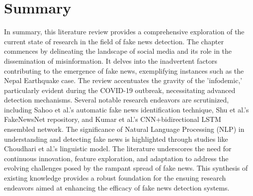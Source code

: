 \section{Summary} 
In summary, this literature review provides a comprehensive exploration of the current state of research in the field of fake news detection. The chapter commences by delineating the landscape of social media and its role in the dissemination of misinformation. It delves into the inadvertent factors contributing to the emergence of fake news, exemplifying instances such as the Nepal Earthquake case. The review accentuates the gravity of the 'infodemic,' particularly evident during the COVID-19 outbreak, necessitating advanced detection mechanisms. Several notable research endeavors are scrutinized, including Sahoo et al.'s automatic fake news identification technique, Shu et al.'s FakeNewsNet repository, and Kumar et al.'s CNN+bidirectional LSTM ensembled network. The significance of Natural Language Processing (NLP) in understanding and detecting fake news is highlighted through studies like Choudhari et al.'s linguistic model. The literature underscores the need for continuous innovation, feature exploration, and adaptation to address the evolving challenges posed by the rampant spread of fake news. This synthesis of existing knowledge provides a robust foundation for the ensuing research endeavors aimed at enhancing the efficacy of fake news detection systems.~\\
